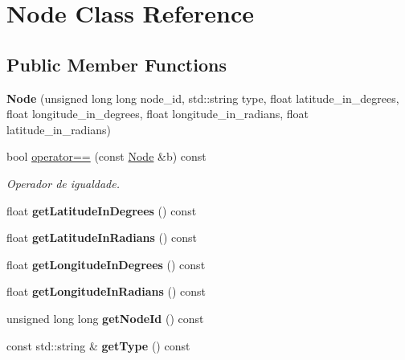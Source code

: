 \hypertarget{class_node}{}\section{Node Class Reference}
\label{class_node}
\subsection*{Public Member Functions}
\begin{DoxyCompactItemize}
\item 
\hypertarget{class_node_a5002dfe1d04665bbcfe7cce06f28d9a4}{}\label{class_node_a5002dfe1d04665bbcfe7cce06f28d9a4} 
{\bfseries Node} (unsigned long long node\+\_\+id, std\+::string type, float latitude\+\_\+in\+\_\+degrees, float longitude\+\_\+in\+\_\+degrees, float longitude\+\_\+in\+\_\+radians, float latitude\+\_\+in\+\_\+radians)
\item 
bool \hyperlink{class_node_a551edd0a6b25f77d410d018c41219855}{operator==} (const \hyperlink{class_node}{Node} \&b) const
\begin{DoxyCompactList}\small\item\em Operador de igualdade. \end{DoxyCompactList}\item 
\hypertarget{class_node_a0035b25f726770d811a8797dd2d81f97}{}\label{class_node_a0035b25f726770d811a8797dd2d81f97} 
float {\bfseries get\+Latitude\+In\+Degrees} () const
\item 
\hypertarget{class_node_a70717903373e839ee0a1d498fa1841f1}{}\label{class_node_a70717903373e839ee0a1d498fa1841f1} 
float {\bfseries get\+Latitude\+In\+Radians} () const
\item 
\hypertarget{class_node_ae1128c36ac2a295acc1d2e9597c61307}{}\label{class_node_ae1128c36ac2a295acc1d2e9597c61307} 
float {\bfseries get\+Longitude\+In\+Degrees} () const
\item 
\hypertarget{class_node_a9d38e0d02ea796be11f6701da9d195b4}{}\label{class_node_a9d38e0d02ea796be11f6701da9d195b4} 
float {\bfseries get\+Longitude\+In\+Radians} () const
\item 
\hypertarget{class_node_a1ffdec2aada47f0b859a977d6a995442}{}\label{class_node_a1ffdec2aada47f0b859a977d6a995442} 
unsigned long long {\bfseries get\+Node\+Id} () const
\item 
\hypertarget{class_node_aa37e8f9dfb5cc3ed4b18f5566e27251f}{}\label{class_node_aa37e8f9dfb5cc3ed4b18f5566e27251f} 
const std\+::string \& {\bfseries get\+Type} () const
\end{DoxyCompactItemize}


